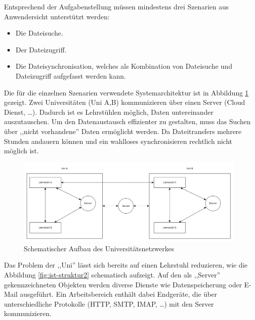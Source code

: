 \documentclass[oneside, ngerman, toc=bibliography,bibliography=totoc,listof=entryprefix, open=right,numbers=noenddot,fontsize=12pt]{scrbook}
\begin{document}
Entsprechend der Aufgabenstellung müssen mindestens drei Szenarien aus Anwendersicht unterstützt werden:
\begin{itemize}
	\item Die Dateisuche.
    \item Der Dateizugriff.
    \item Die Dateisynchronisation, welches als Kombination von Dateisuche und Dateizugriff aufgefasst werden kann.
\end{itemize}

Die für die einzelnen Szenarien verwendete Systemarchitektur ist in Abbildung \ref{fig:ist-struktur} gezeigt. Zwei Universitäten (Uni A,B) kommunizieren über einen Server (Cloud Dienst, \ldots). Dadurch ist es Lehrstühlen möglich, Daten untereinander auszutauschen. Um den Datenaustausch effizienter zu gestalten, muss das Suchen über ,,nicht vorhandene'' Daten ermöglicht werden. Da Dateitransfers mehrere Stunden andauern können und ein wahlloses synchronisieren rechtlich nicht möglich ist.

\begin{figure}[htbp] 
    \centering
    \includegraphics[width=\textwidth]{Masterarbeit_Bilder/Lehrstuhl_Datentausch_extern.png}
    \caption{Schematischer Aufbau des Universitätsnetzwerkes}
    \label{fig:ist-struktur}
\end{figure}    

Das Problem der ,,Uni'' lässt sich bereits auf einen Lehrstuhl reduzieren, wie  die Abbildung \ref{fig:ist-struktur2} schematisch aufzeigt.
Auf den als ,,Server'' gekennzeichneten Objekten werden diverse Dienste wie Datenspeicherung oder E-Mail ausgeführt. Ein Arbeitsbereich enthält dabei Endgeräte, die über unterschiedliche Protokolle (HTTP, SMTP, IMAP, \ldots) mit den Server kommunizieren.
\end{document}
